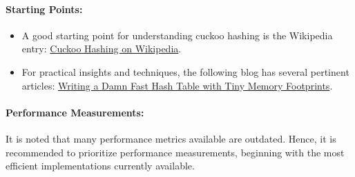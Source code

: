 \documentclass[11pt]{article}
\begin{document}
\paragraph{Starting Points:}
\begin{itemize}
    \item A good starting point for understanding cuckoo hashing is the Wikipedia entry: \href{https://en.wikipedia.org/wiki/Cuckoo_hashing}{Cuckoo Hashing on Wikipedia}.
    
    \item For practical insights and techniques, the following blog has several pertinent articles: \href{http://www.idryman.org/blog/2017/05/03/writing-a-damn-fast-hash-table-with-tiny-memory-footprints/}{Writing a Damn Fast Hash Table with Tiny Memory Footprints}.
\end{itemize}

\paragraph{Performance Measurements:}
It is noted that many performance metrics available are outdated. Hence, it is recommended to prioritize performance measurements, beginning with the most efficient implementations currently available.

\clearpage

\clearpage
\end{document}
